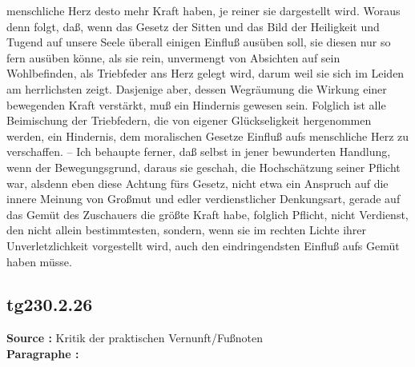 \documentclass[a4paper,12pt,twoside]{book}
\begin{document}
menschliche Herz desto mehr Kraft haben, je reiner sie dargestellt wird. Woraus denn folgt, daß, wenn das Gesetz der Sitten und das Bild der Heiligkeit und Tugend auf unsere Seele überall einigen Einfluß ausüben soll, sie diesen nur so fern ausüben könne, als sie rein, unvermengt von Absichten auf sein Wohlbefinden, als Triebfeder ans Herz gelegt wird, darum weil sie sich im Leiden am herrlichsten zeigt. Dasjenige aber, dessen Wegräumung die Wirkung einer bewegenden Kraft verstärkt, muß ein Hindernis gewesen sein. Folglich ist alle Beimischung der Triebfedern, die von eigener Glückseligkeit hergenommen werden, ein Hindernis, dem moralischen Gesetze Einfluß aufs menschliche Herz zu verschaffen. – Ich behaupte ferner, daß selbst in jener bewunderten Handlung, wenn der Bewegungsgrund, daraus sie geschah, die Hochschätzung seiner Pflicht war, alsdenn eben diese Achtung fürs Gesetz, nicht etwa ein Anspruch  auf die innere Meinung von Großmut und edler verdienstlicher Denkungsart, gerade auf das Gemüt des Zuschauers die größte Kraft habe, folglich Pflicht, nicht Verdienst, den nicht allein bestimmtesten, sondern, wenn sie im rechten Lichte ihrer Unverletzlichkeit vorgestellt wird, auch den eindringendsten Einfluß aufs Gemüt haben müsse. 
	
	\subsection*{tg230.2.26} 
	\textbf{Source : }Kritik der praktischen Vernunft/Fußnoten\\  
	
	\noindent\textbf{Paragraphe : }
	
\end{document}
